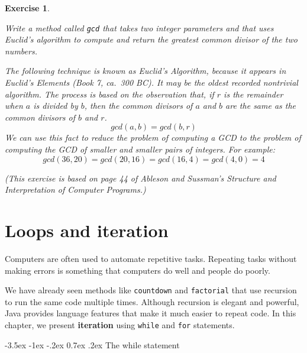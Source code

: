 \documentclass[12pt]{book}
\makeatletter
\theoremstyle{exercise}
\newtheorem{exercise}{Exercise}[chapter]
\newcommand{\java}[1]{\verb"#1"}
\renewcommand{\section}{\@startsection {section}{1}{\z@}%
    {-3.5ex \@plus -1ex \@minus -.2ex}%
    {0.7ex \@plus.2ex}%
    {\normalfont\Large\bfseries}}
\newcommand{\java}[1]{\lstinline{#1}} %
\makeatother
\begin{document}
\begin{exercise}
\label{gcd}

Write a method called \java{gcd} that takes two integer parameters and that uses Euclid's algorithm to compute and return the greatest common divisor of the two numbers.

The following technique is known as Euclid's Algorithm, because it appears in Euclid's {\em Elements} (Book 7, ca.~300 BC).
It may be the oldest recorded nontrivial algorithm.
The process is based on the observation that, if $r$ is the remainder when $a$ is divided by $b$, then the common divisors of $a$ and $b$ are the same as the common divisors of $b$ and $r$.
\[ gcd(a, b) = gcd(b, r) \]
%
We can use this fact to reduce the problem of computing a GCD to the problem of computing the GCD of smaller and smaller pairs of integers.
For example:
\[ gcd(36, 20) = gcd(20, 16) = gcd(16, 4) = gcd(4, 0) = 4 \]


(This exercise is based on page 44 of Ableson and Sussman's {\em Structure and Interpretation of Computer Programs}.)

\end{exercise}


\chapter{Loops and iteration}

Computers are often used to automate repetitive tasks.
Repeating tasks without making errors is something that computers do well and people do poorly.


We have already seen methods like \java{countdown} and \java{factorial} that use recursion to run the same code multiple times.
Although recursion is elegant and powerful, Java provides language features that make it much easier to repeat code.
In this chapter, we present {\bf iteration} using \java{while} and \java{for} statements.


\section{The while statement}

\end{document}
